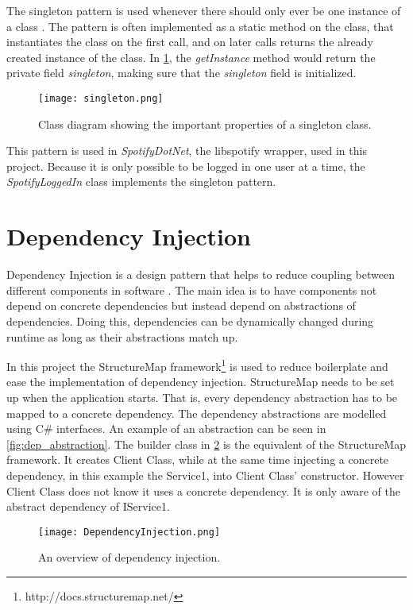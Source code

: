The singleton pattern is used whenever there should only ever be one
instance of a class \cite{skeet2013c}. The pattern is often implemented as a static
method on the class, that instantiates the class on the first call,
and on later calls returns the already created instance of the class. In
\cref{fig:singleton}, the \textit{getInstance} method would return the private field
\textit{singleton}, making sure that the \textit{singleton} field is initialized.

\begin{figure}[H]
  \centering
  \texttt{[image: singleton.png]}
  \caption{Class diagram showing the important properties of a
    singleton class.}\label{fig:singleton}
\end{figure}

This pattern is used in \textit{SpotifyDotNet}, the libspotify wrapper, used in
this project. Because it is only possible to be logged in one user at
a time, the \textit{SpotifyLoggedIn} class implements the singleton pattern.

\section{Dependency Injection}

Dependency Injection is a design pattern that helps to reduce coupling
between different components in software \cite{injection}. The main idea is
to have components not depend on concrete dependencies but instead
depend on abstractions of dependencies. Doing this, dependencies can
be dynamically changed during runtime as long as their abstractions
match up.

In this project the StructureMap framework\footnote{http://docs.structuremap.net/} is used to reduce
boilerplate and ease the implementation of dependency
injection. StructureMap needs to be set up when the application
starts. That is, every dependency abstraction has to be mapped to a
concrete dependency. The dependency abstractions are modelled using
C\# interfaces. An example of an abstraction can be seen in
\cref{fig:dep_abstraction}. The
builder class in \cref{fig:dependencyInjection} is the equivalent of the StructureMap
framework. It creates Client Class, while at the same time injecting a
concrete dependency, in this example the Service1, into Client Class' constructor. However Client
Class does not know it uses a concrete dependency. It is only aware of
the abstract dependency of IService1.

\begin{figure}
  \centering
  \texttt{[image: DependencyInjection.png]}
  \caption{An overview of dependency injection.}\label{fig:dependencyInjection}
\end{figure}

